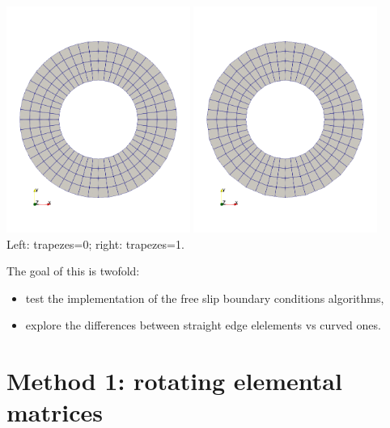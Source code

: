 \begin{center}
\includegraphics[width=6cm]{./python_codes/fieldstone_151/images/mesh1}
\includegraphics[width=6cm]{./python_codes/fieldstone_151/images/mesh2}\\
{\captionfont Left: {\python trapezes=0}; right:   {\python trapezes=1}.}
\end{center}

\noindent The goal of this \stone is twofold:
\begin{itemize}
\item test the implementation of the free slip boundary conditions algorithms,
\item explore the differences between straight edge elelements vs curved ones.
\end{itemize}






\newpage
\section*{Method 1: rotating elemental matrices}

